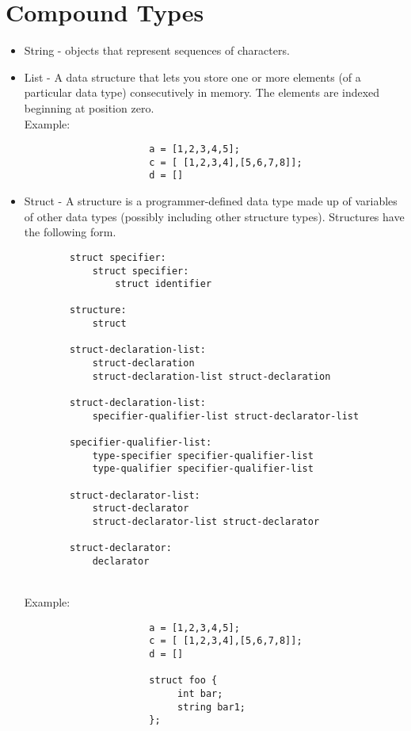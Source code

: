 \documentclass[./LRM_main.tex]{subfiles}
\begin{document}
\section{Compound Types}
\begin{itemize}
    \item String - objects that represent sequences of characters. 
    \item List - A data structure that lets you store one or more elements (of a particular data type) consecutively in memory. The elements are indexed beginning at position zero. 
    \\Example:

\begin{lstlisting}
                      a = [1,2,3,4,5];
		              c = [ [1,2,3,4],[5,6,7,8]];
		              d = []
\end{lstlisting}
    \item Struct - A structure is a programmer-defined data type made up of variables of other data types (possibly including other structure types). Structures have the following form.
    \begin{lstlisting}
        struct specifier:
            struct specifier:
                struct identifier
                
        structure:
            struct
            
        struct-declaration-list:
            struct-declaration
            struct-declaration-list struct-declaration
        
        struct-declaration-list:
            specifier-qualifier-list struct-declarator-list
        
        specifier-qualifier-list:
            type-specifier specifier-qualifier-list
            type-qualifier specifier-qualifier-list
        
        struct-declarator-list:
            struct-declarator
            struct-declarator-list struct-declarator
        
        struct-declarator:
            declarator
  \end{lstlisting}
 \\ Example:
        \begin{lstlisting}
                      a = [1,2,3,4,5];
		              c = [ [1,2,3,4],[5,6,7,8]];
		              d = []
		              
		              struct foo {
			               int bar;
			               string bar1;
                      };


\end{lstlisting}
\end{itemize}
\end{document}
